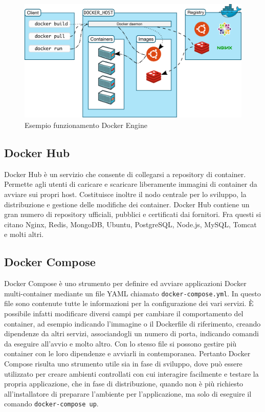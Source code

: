 \begin{figure}[h]
    \centering
    \includegraphics[width=\textwidth]{immagini/architecture.png}
    \caption{Esempio funzionamento Docker Engine}
    \label{fig:docker-architecture-example}
\end{figure}

\subsection{Docker Hub}\label{docker-hub}
Docker Hub è un servizio che consente di collegarsi a repository di container. Permette agli utenti di caricare e scaricare liberamente immagini di container da avviare sui propri host. Costituisce inoltre il nodo centrale per lo sviluppo, la distribuzione e gestione delle modifiche dei container. Docker Hub contiene un gran numero di repository ufficiali, pubblici e certificati dai fornitori. Fra questi si citano Nginx, Redis, MongoDB, Ubuntu, PostgreSQL, Node.js, MySQL, Tomcat e molti altri.

\subsection{Docker Compose}
Docker Compose è uno strumento per definire ed avviare applicazioni Docker multi-container mediante un file YAML chiamato \verb|docker-compose.yml|. In questo file sono contenute tutte le informazioni per la configurazione dei vari servizi. È possibile infatti modificare diversi campi per cambiare il comportamento del container, ad esempio indicando l'immagine o il Dockerfile di riferimento, creando dipendenze da altri servizi, associandogli un numero di porta, indicando comandi da eseguire all'avvio e molto altro. Con lo stesso file si possono gestire più container con le loro dipendenze e avviarli in contemporanea. Pertanto Docker Compose risulta uno strumento utile sia in fase di sviluppo, dove può essere utilizzato per creare ambienti controllati con cui interagire facilmente e testare la propria applicazione, che in fase di distribuzione, quando non è più richiesto all'installatore di preparare l'ambiente per l'applicazione, ma solo di eseguire il comando \verb|docker-compose up|.

